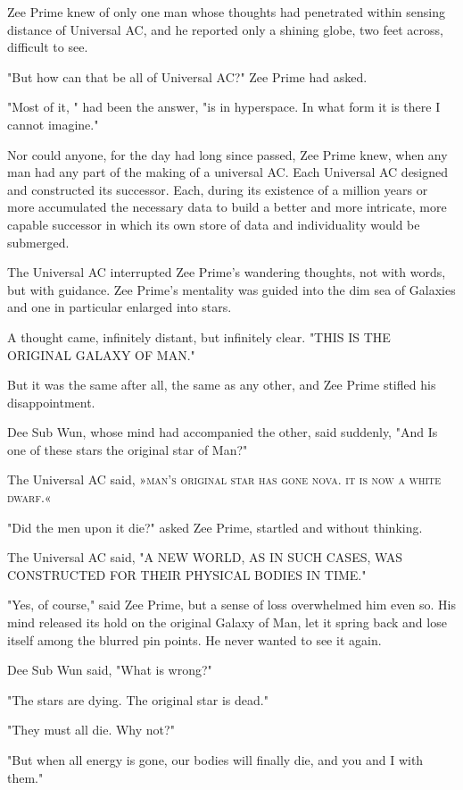 \documentclass[11pt,twocolumn,paper=a5,pagesize]{article}
\newcommand{\q}[1]{»#1«}
\begin{document}
{Zee Prime knew of only one man whose thoughts had penetrated within sensing distance of Universal AC, and he reported only a shining globe, two feet across, difficult to see.

"But how can that be all of Universal AC?" Zee Prime had asked.

"Most of it, " had been the answer, "is in hyperspace. In what form it is there I cannot imagine."

Nor could anyone, for the day had long since passed, Zee Prime knew, when any man had any part of the making of a universal AC. Each Universal AC designed and constructed its successor. Each, during its existence of a million years or more accumulated the necessary data to build a better and more intricate, more capable successor in which its own store of data and individuality would be submerged.

The Universal AC interrupted Zee Prime's wandering thoughts, not with words, but with guidance. Zee Prime's mentality was guided into the dim sea of Galaxies and one in particular enlarged into stars.

A thought came, infinitely distant, but infinitely clear. "THIS IS THE ORIGINAL GALAXY OF MAN."

But it was the same after all, the same as any other, and Zee Prime stifled his disappointment.

Dee Sub Wun, whose mind had accompanied the other, said suddenly, "And Is one of these stars the original star of Man?"

The Universal AC said, \q{\textsc{man's original star has gone nova. it is now a white dwarf.}}

"Did the men upon it die?" asked Zee Prime, startled and without thinking.

The Universal AC said, "A NEW WORLD, AS IN SUCH CASES, WAS CONSTRUCTED FOR THEIR PHYSICAL BODIES IN TIME."

"Yes, of course," said Zee Prime, but a sense of loss overwhelmed him even so. His mind released its hold on the original Galaxy of Man, let it spring back and lose itself among the blurred pin points. He never wanted to see it again.

Dee Sub Wun said, "What is wrong?"

"The stars are dying. The original star is dead."

"They must all die. Why not?"

"But when all energy is gone, our bodies will finally die, and you and I with them."

}
\end{document}
